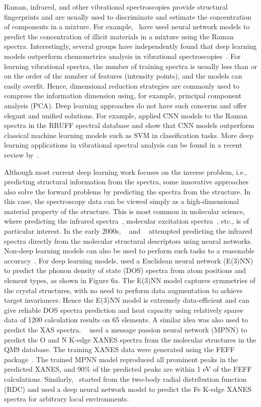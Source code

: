 \documentclass[pdflatex,sn-mathphys]{sn-jnl}%
\theoremstyle{thmstyleone}%
\theoremstyle{thmstyletwo}%
\theoremstyle{thmstylethree}%
\begin{document}
Raman, infrared, and other vibrational spectroscopies provide structural fingerprints and are usually used to discriminate and estimate the concentration of components in a mixture. For example,~\cite{Madden.17} have used neural network models to predict the concentration of illicit materials in a mixture using the Raman spectra. Interestingly, several groups have independently found that deep learning models outperform chemometrics analysis in vibrational spectroscopies~\cite{18,19}. For learning vibrational spectra, the number of training spectra is usually less than or on the order of the number of features (intensity points), and the models can easily overfit. Hence, dimensional reduction strategies are commonly used to compress the information dimension using, for example, principal component analysis (PCA)\cite{20,21}. Deep learning approaches do not have such concerns and offer elegant and unified solutions. For example, \cite{Liu.22} applied CNN models to the Raman spectra in the RRUFF spectral database and show that CNN models outperform classical machine learning models such as SVM in classification tasks. More deep learning applications in vibrational spectral analysis can be found in a recent review by~\cite{Yang.23}.

Although most current deep learning work focuses on the inverse problem, i.e., predicting structural information from the spectra, some innovative approaches also solve the forward problems by predicting the spectra from the structure. In this case, the spectroscopy data can be viewed simply as a high-dimensional material property of the structure. This is most common in molecular science, where predicting the infrared spectra~\cite{24,25}, molecular excitation spectra~\cite{26}, etc., is of particular interest. In the early 2000s, ~\cite{Selzer.24} and ~\cite{Kostka.25} attempted predicting the infrared spectra directly from the molecular structural descriptors using neural networks. Non-deep learning models can also be used to perform such tasks to a reasonable accuracy~\cite{27}. For deep learning models, \cite{Chen.28} used a Euclidean neural network (E(3)NN) to predict the phonon density of state (DOS) spectra from atom positions and element types, as shown in Figure 6a. The E(3)NN model captures symmetries of the crystal structures, with no need to perform data augmentation to achieve target invariances. Hence the E(3)NN model is extremely data-efficient and can give reliable DOS spectra prediction and heat capacity using relatively sparse data of 1200 calculation results on 65 elements. A similar idea was also used to predict the XAS spectra. ~\cite{Carbone.29} used a message passion neural network (MPNN) to predict the O and N K-edge XANES spectra from the molecular structures in the QM9 database\cite{30}. The training XANES data were generated using the FEFF package~\cite{feff}. The trained MPNN model reproduced all prominent peaks in the predicted XANES, and 90\% of the predicted peaks are within 1 eV of the FEFF calculations. Similarly,~\cite{Rankine.32} started from the two-body radial distribution function (RDC) and used a deep neural network model to predict the Fe K-edge XANES spectra for arbitrary local environments. 
\end{document}
